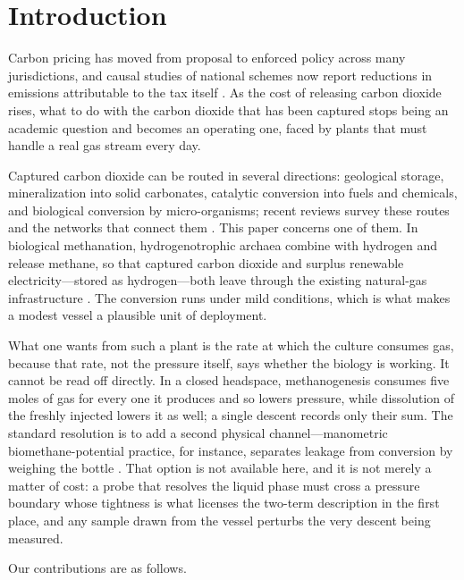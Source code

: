 \documentclass[runningheads]{llncs}
\begin{document}
\section{Introduction}
\label{sec:intro}

Carbon pricing has moved from proposal to enforced policy across many
jurisdictions, and causal studies of national schemes now report
reductions in emissions attributable to the tax itself
\cite{gugler2023carbon}. As the cost of releasing carbon dioxide
rises, what to do with the carbon dioxide that has been captured stops
being an academic question and becomes an operating one, faced by
plants that must handle a real gas stream every day.

Captured carbon dioxide can be routed in several directions:
geological storage, mineralization into solid carbonates, catalytic
conversion into fuels and chemicals, and biological conversion by
micro-organisms; recent reviews survey these routes and the networks
that connect them \cite{ghiat2025circularity}. This paper concerns one
of them. In biological methanation, hydrogenotrophic archaea combine
 with hydrogen and release methane, so that captured carbon
dioxide and surplus renewable electricity---stored as hydrogen---both
leave through the existing natural-gas infrastructure
\cite{gonzalez2023biological}. The conversion runs under mild
conditions, which is what makes a modest vessel a plausible unit of
deployment.

What one wants from such a plant is the rate at which the culture
consumes gas, because that rate, not the pressure itself, says whether
the biology is working. It cannot be read off directly. In a closed
headspace, methanogenesis consumes five moles of gas for every one it
produces and so lowers pressure, while dissolution of the freshly
injected  lowers it as well; a single descent records only
their sum. The standard resolution is to add a second physical
channel---manometric biomethane-potential practice, for instance,
separates leakage from conversion by weighing the bottle
\cite{hafner2018quantification}. That option is not available here, and
it is not merely a matter of cost: a probe that resolves the liquid
phase must cross a pressure boundary whose tightness is what licenses
the two-term description in the first place, and any sample drawn from
the vessel perturbs the very descent being measured.

Our contributions are as follows.
\end{document}
